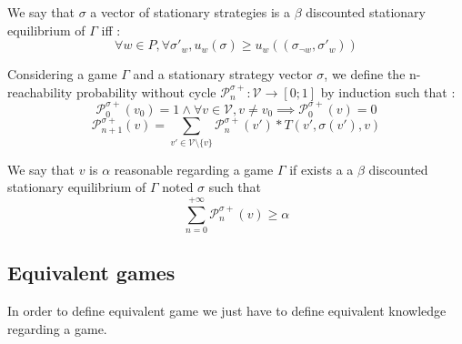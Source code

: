 \begin{mydef}
	We say that $\sigma$ a vector of stationary strategies is a $\beta$ discounted stationary equilibrium of $\Gamma$ iff : 
	$$\forall w \in P, \forall \sigma'_w,  u_w(\sigma) \geq u_w((\sigma_{\neg w},\sigma'_w)) $$
\end{mydef}


\begin{mydef}
	Considering a game $\Gamma$ and a stationary strategy vector $\sigma$, 
	we define the n-reachability probability without cycle $\mathcal{P}^{\sigma+}_n : \mathcal{V} \rightarrow [0;1]$ by induction such that :
	$$\mathcal{P}^{\sigma+}_0(v_0) = 1 \land \forall v \in \mathcal{V},  v \neq v_0 \implies \mathcal{P}^{\sigma+}_0(v) = 0$$
	$$\mathcal{P}^{\sigma+}_{n+1}(v) = \sum_{v' \in \mathcal{V}\setminus\{v\}} \mathcal{P}^{\sigma+}_{n}(v') * T(v',\sigma(v'),v)$$
\end{mydef}

\begin{mydef}
	We say that $v$ is $\alpha$ reasonable  regarding a game $\Gamma$ if exists a a $\beta$ discounted stationary equilibrium of $\Gamma$ noted $\sigma$ such that $$\sum_{n=0}^{+\infty} \mathcal{P}^{\sigma+}_{n}(v) \geq \alpha$$
\end{mydef}




\subsection{Equivalent games}

In order to define equivalent game we just have to define equivalent knowledge regarding a game.

